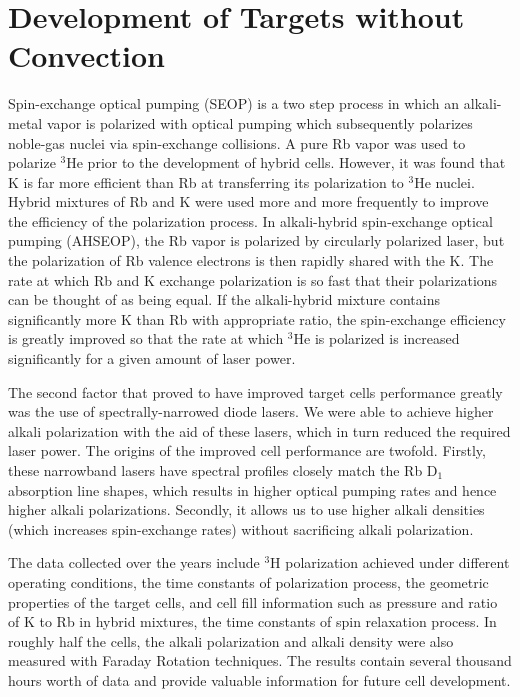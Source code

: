 \section{Development of Targets without Convection}

Spin-exchange optical pumping (SEOP) is a two step process in which an alkali-metal vapor is polarized with optical pumping which subsequently polarizes noble-gas nuclei via spin-exchange collisions. A pure Rb vapor was used to polarize $^{3}$He prior to the development of hybrid cells. However, it was found that K is far more efficient than Rb at transferring its polarization to $^{3}$He nuclei. Hybrid mixtures of Rb and K were used more and more frequently to improve the efficiency of the polarization process. In alkali-hybrid spin-exchange optical pumping (AHSEOP), the Rb vapor is polarized by circularly polarized laser, but the polarization of Rb valence electrons is then rapidly shared with the K. The rate at which Rb and K exchange polarization is so fast that their polarizations can be thought of as being equal. If the alkali-hybrid mixture contains significantly more K than Rb with appropriate ratio, the spin-exchange efficiency is greatly improved so that the rate at which $^{3}$He is polarized is increased significantly for a given amount of laser power.

The second factor that proved to have improved target cells performance greatly was the use of spectrally-narrowed diode lasers. We were able to achieve higher alkali polarization with the aid of these lasers, which in turn reduced the required laser power. The origins of the improved cell performance are twofold. Firstly, these narrowband lasers have spectral profiles closely match the Rb D$_{1}$ absorption line shapes, which results in higher optical pumping rates and hence higher alkali polarizations. Secondly, it allows us to use higher alkali densities (which increases spin-exchange rates) without sacrificing alkali polarization. 

The data collected over the years include $^{3}$H polarization achieved under different operating conditions, the time constants of polarization process, the geometric properties of the target cells, and cell fill information such as pressure and ratio of K to Rb in hybrid mixtures, the time constants of spin relaxation process. In roughly half the cells, the alkali polarization and alkali density were also measured with Faraday Rotation techniques. The results contain several thousand hours worth of data and provide valuable information for future cell development.

